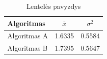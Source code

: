 \documentclass[
]{VUMIFPSbakalaurinis}
\begin{document}

\begin{table}[H]\footnotesize
  \centering
  \caption{Lentelės pavyzdys}
  {\begin{tabular}{|l|c|c|} \hline
    Algoritmas & $\bar{x}$ & $\sigma^{2}$ \\
    \hline
    Algoritmas A  & 1.6335    & 0.5584       \\
    Algoritmas B  & 1.7395    & 0.5647       \\
    \hline
  \end{tabular}}
  \label{tab:table example}
\end{table}
\end{document}
